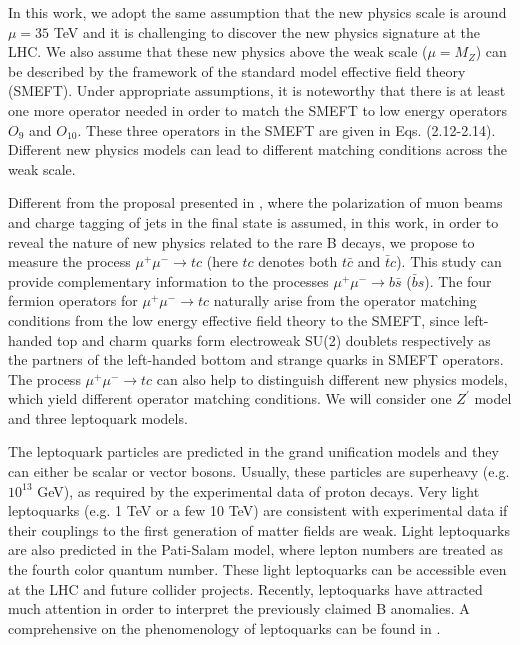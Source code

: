 \documentclass[a4paper,11pt]{article}
\begin{document}
In this work, we adopt the same assumption that the new physics scale is around $\mu=35$ TeV and it is challenging to discover the new physics signature at the LHC. 
We also assume that these new physics above the weak scale ($\mu=M_Z$) can be described by the framework of the standard model effective field theory (SMEFT). 
Under appropriate assumptions, it is noteworthy that there is at least one more operator needed in order to match the SMEFT to low energy operators $O_9$ and $O_{10}$. 
These three operators in the SMEFT are given in Eqs. (2.12-2.14). 
Different new physics models can lead to different matching conditions across the weak scale.

Different from the proposal presented in \cite{Altmannshofer:2022xri}, 
where the polarization of muon beams and charge tagging of jets in the final state is assumed, 
in this work, in order to reveal the nature of new physics related to the rare B decays, 
we propose to measure the process $\mu^+\mu^-\to tc$ (here $tc$ denotes both $t \bar{c}$ and $\bar{t} c$). 
This study can provide complementary information to the processes $\mu^+\mu^-\to b \bar{s}$ ($\bar{b} s$). 
The four fermion operators for $\mu^+\mu^-\to tc$ naturally arise from the operator matching conditions from the low energy effective field theory to the SMEFT, 
since left-handed top and charm quarks form electroweak SU(2) doublets respectively as the partners of the left-handed bottom and strange quarks in SMEFT operators. 
The process $\mu^+\mu^-\to tc$ can also help to distinguish different new physics models, which yield different operator matching conditions. 
We will consider one $Z^\prime$ model and three leptoquark models.
 
The leptoquark particles are predicted in the grand unification models and they can either be scalar or vector bosons. 
Usually, these particles are superheavy (e.g. $10^{13}$ GeV), as required by the experimental data of proton decays. 
Very light leptoquarks (e.g. 1 TeV or a few 10 TeV) are consistent with experimental data if their couplings to the first generation of matter fields are weak. 
Light leptoquarks are also predicted in the Pati-Salam model, where lepton numbers are treated as the fourth color quantum number. 
These light leptoquarks can be accessible even at the LHC and future collider projects. 
Recently, leptoquarks have attracted much attention in order to interpret the previously claimed B anomalies. 
A comprehensive on the phenomenology of leptoquarks can be found in \cite{Dorsner:2016wpm}.
\end{document}
